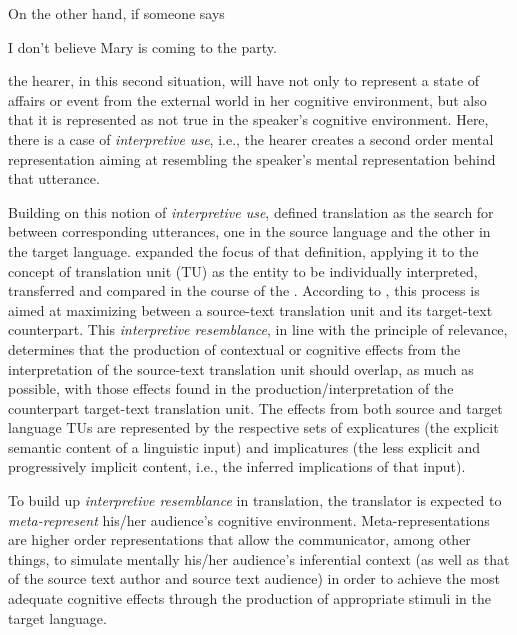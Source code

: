 \documentclass[output=paper]{langsci/langscibook}
\begin{document}
On the other hand, if someone says 

\ea
I don't believe Mary is coming to the party. \\
\z

the hearer, in this second situation, will have not only to represent a state of affairs or event from the external world in her cognitive environment, but also that it is represented as not true in the speaker's cognitive environment. Here, there is a case of \textit{interpretive use}, i.e., the hearer creates a second order mental representation aiming at resembling the speaker's mental representation behind that utterance. 


Building on this notion of \textit{interpretive use}, \citet{Gutt1991} defined translation as the search for \textit{ }between corresponding utterances, one in the source language and the other in the target language. \citet{Goncalves2003} expanded the focus of that definition, applying it to the concept of translation unit (TU) as the entity to be individually interpreted, transferred and compared in the course of the . According to \citet{Goncalves2003}, this process is aimed at maximizing \textit{ }between a source-text translation unit and its target-text counterpart. This \textit{interpretive resemblance}, in line with the principle of relevance, determines that the production of contextual or cognitive effects from the interpretation of the source-text translation unit should overlap, as much as possible, with those effects found in the production/interpretation of the counterpart target-text translation unit. The effects from both source and target language TUs are represented by the respective sets of explicatures (the explicit semantic content of a linguistic input) and implicatures (the less explicit and progressively implicit content, i.e., the inferred implications of that input).



To build up \textit{interpretive resemblance} in translation, the translator is expected to \textit{meta-represent} his/her audience's cognitive environment. Meta-representations are higher order representations that allow the communicator, among other things, to simulate mentally his/her audience's inferential context (as well as that of the source text author and source text audience) in order to achieve the most adequate cognitive effects through the production of appropriate stimuli in the target language.  
\end{document}

